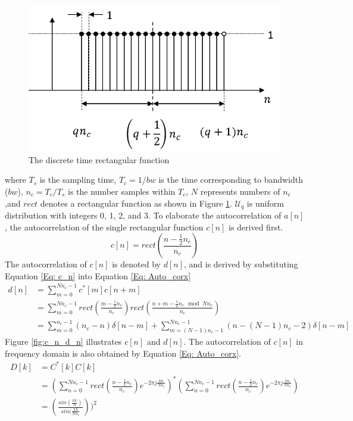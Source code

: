 \documentclass[draftcls,onecolumn]{IEEEtran}  %
\begin{document}
\begin{figure}[t!]
	\centering
	\includegraphics[width=3 in]{pdf/a_n.jpg}
	\caption{The discrete time rectangular function}
	\label{fig:a_n}
\end{figure}
where $T_s$ is the sampling time, $T_c=1/bw$ is the time corresponding to bandwidth ($bw$), $n_c=T_c/T_s$ is the number samples within $T_c$, $N$ represents numbers of $n_c$ ,and $rect$ denotes a rectangular function as shown in Figure \ref{fig:a_n}. $\mathcal{U}_q$ is uniform distribution with integers 0, 1, 2, and 3. To elaborate the autocorrelation of $a[n]$, the autocorrelation of the single rectangular function $c[n]$ is derived first. 
\begin{equation}\label{Eq: c_n}
c[n] = rect(\frac{n-\frac{1}{2} n_c}{n_c})
\end{equation}
The autocorrelation of $c[n]$ is denoted by $d[n]$, and is derived by substituting Equation \ref{Eq: c_n} into Equation \ref{Eq: Auto_corx}
\begin{equation}\label{Eq: d_n}
\begin{split}
d[n] &= \sum\limits_{m=0}^{Nn_c-1} c^*[m] c[n+m] \\
	 &= \sum\limits_{m=0}^{Nn_c-1} rect(\frac{m-\frac{1}{2} n_c}{n_c}) rect(\frac{n+m-\frac{1}{2} n_c \mod Nn_c}{n_c}) \\
     &= \sum\limits_{m=0}^{n_c-1} (n_c-n)\delta[n-m] + 
        \sum\limits_{m=(N-1)n_c-1}^{Nn_c-1} (n-(N-1)n_c-2)\delta[n-m] 
\end{split}
\end{equation}
Figure \ref{fig:c_n_d_n} illustrates $c[n]$ and $d[n]$. The autocorrelation of $c[n]$ in frequency domain is also obtained by Equation \ref{Eq: Auto_corx}.
\begin{equation}\label{Eq: D_k}
\begin{split}
D[k] &= C^*[k] C[k] \\
	 &= (\sum\limits_{n=0}^{Nn_c-1} rect(\frac{n-\frac{1}{2} n_c}{n_c}) e^{-2\pi j \frac{kn}{Nn_c}})^* 
     (\sum\limits_{n=0}^{Nn_c-1} rect(\frac{n-\frac{1}{2} n_c}{n_c}) e^{-2\pi j \frac{kn}{Nn_c}} ) \\
     &= (\frac{ sin(\frac{\pi k}{N})}{sin(\frac{\pi k}{N n_c}}))^2
\end{split}
\end{equation}
\end{document}
